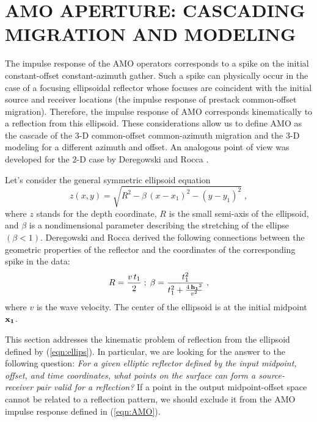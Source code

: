 \section{AMO APERTURE: CASCADING MIGRATION AND MODELING}
The impulse response of the AMO operators corresponds to a spike on
the initial constant-offset constant-azimuth gather. Such a spike
can physically occur in the case of a focusing ellipsoidal
reflector whose focuses are coincident with the initial source and
receiver locations (the impulse response of prestack common-offset
migration). Therefore, the impulse response of AMO corresponds 
kinematically to a reflection from this ellipsoid. These
considerations allow us to define AMO as the cascade of the 3-D
common-offset common-azimuth migration and the 3-D modeling for a different
azimuth and offset. An analogous point of
view was
developed for the 2-D case
by Deregowski and Rocca .      
\par
Let's consider the general symmetric ellipsoid equation
\begin{equation}
z(x,y)=\sqrt{R^2-\beta\,\left(x-x_1\right)^2-\left(y-y_1\right)^2}\;,
\label{eqn:ellips}
\end{equation}
where $z$ stands for the depth coordinate, $R$ is the small semi-axis of the
ellipsoid, and $\beta$ is a nondimensional parameter describing the
stretching of the ellipse $(\beta < 1)$. Deregowski and
Rocca  derived the following connections
between the geometric properties of the reflector and the coordinates
of the corresponding spike in the data:
\begin{equation}
R={{v\,t_1}\over 2}\;;\;
\beta={t_1^2 \over t_1^2+{{4\,{\bf h_1}^2}\over v^2}}\;,
\label{eqn:rbeta}
\end{equation}
where $v$ is the wave velocity. 
The center of the ellipsoid is at the initial midpoint ${\bf x_1}$.
\par
This section addresses the kinematic problem of reflection
from the ellipsoid defined by (\ref{eqn:ellips}). In particular, we are looking for
the answer to the following question: {\em For a given elliptic
reflector defined by the input midpoint, offset, and time coordinates,
what points on the surface can form a source-receiver pair valid for a
reflection?} If a point in the output midpoint-offset space
cannot be related to a reflection pattern, we should exclude it from the AMO
impulse response defined in (\ref{eqn:AMO}).
\par 
